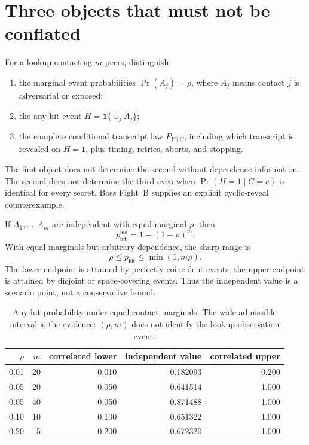 \documentclass[11pt]{article}
\begin{document}
\section{Three objects that must not be conflated}\label{sec:objects}
For a lookup contacting \(m\) peers, distinguish:
\begin{enumerate}[leftmargin=*]
\item the marginal event probabilities \(\Pr(A_j)=\rho\), where \(A_j\) means contact \(j\) is adversarial or exposed;
\item the any-hit event \(H=\mathbf 1\{\cup_j A_j\}\);
\item the complete conditional transcript law \(P_{Y\mid C}\), including which transcript is revealed on \(H=1\), plus timing, retries, aborts, and stopping.
\end{enumerate}
The first object does not determine the second without dependence information. The second does not determine the third even when \(\Pr(H=1\mid C=c)\) is identical for every secret. Boss Fight~B supplies an explicit cyclic-reveal counterexample.

If \(A_1,\ldots,A_m\) are independent with equal marginal \(\rho\), then
\[
p_{\mathsf{hit}}^{\mathsf{ind}}=1-(1-\rho)^m.
\]
With equal marginals but arbitrary dependence, the sharp range is
\[
\rho\le p_{\mathsf{hit}}\le\min(1,m\rho).
\]
The lower endpoint is attained by perfectly coincident events; the upper endpoint is attained by disjoint or space-covering events. Thus the independent value is a scenario point, not a conservative bound.

\begin{table}[H]
\centering
\small
\begin{tabular}{@{}r r r r r@{}}
\toprule
\(\rho\) & \(m\) & correlated lower & independent value & correlated upper\\
\midrule
0.01 & 20 & 0.010 & 0.182093 & 0.200\\
0.05 & 20 & 0.050 & 0.641514 & 1.000\\
0.05 & 40 & 0.050 & 0.871488 & 1.000\\
0.10 & 10 & 0.100 & 0.651322 & 1.000\\
0.20 & 5  & 0.200 & 0.672320 & 1.000\\
\bottomrule
\end{tabular}
\caption{Any-hit probability under equal contact marginals. The wide admissible interval is the evidence: \((\rho,m)\) does not identify the lookup observation event.}
\label{tab:correlation-envelope}
\end{table}
\end{document}
